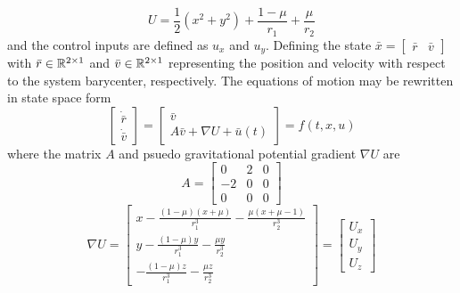 \documentclass[letterpaper, preprint, paper,11pt]{AAS}	%
\begin{document}
\begin{equation}
	U = \frac{1}{2} \left( x^2 + y^2\right) + \frac{1-\mu}{r_1} + \frac{\mu}{r_2}
	\label{eq:eff_pot}
\end{equation}
and the control inputs are defined as \( u_x\) and \(u_y\).
Defining the state \( \bar{x} = \begin{bmatrix}\bar{r} &\bar{v} \end{bmatrix}\) with \(\bar{r} \in \mathbb{R}^{2\times1}\) and \(\bar{v} \in \mathbb{R}^{2\times1}\) representing the position and velocity with respect to the system barycenter, respectively.
The equations of motion may be rewritten in state space form
\begin{equation}
	\left[\begin{array}{c} \dot{\bar{r}} \\ \dot{\bar{v}} \end{array} \right] = 
	\left[ \begin{array}{c} \bar{v} \\ A \bar{v} + \nabla U + \bar{u}(t) \end{array} \right] = f\left( t,x, u\right)
\end{equation}
where the matrix \( A \) and psuedo gravitational potential gradient \( \nabla U\) are
\begin{equation}\label{eq:A_mat}
	A = \left[ \begin{array}{ccc} 0 & 2 & 0 \\ -2 & 0 & 0 \\ 0 & 0 & 0 \end{array} \right]
\end{equation}
\begin{equation} \label{eq:grav_pot}
	\nabla U = \left[ \begin{array}{c} x - \frac{ \left(1 - \mu\right) \left(x + \mu\right)}{r_1^3} - \frac{\mu \left( x+ \mu -1\right)}{r_2^3} \\
											y - \frac{ \left(1 - \mu\right) y}{r_1^3} - \frac{\mu y}{r_2^3} \\
											- \frac{ \left(1 - \mu\right) z}{r_1^3} - \frac{\mu z}{r_2^3}\end{array}\right]
					= \left[\begin{array}{c} U_x \\ U_y \\ U_z\end{array} \right]
\end{equation}
\end{document}
